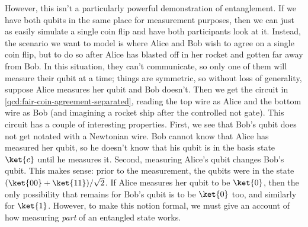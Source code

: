 However, this isn't a particularly powerful demonstration of entanglement.  If
we have both qubits in the same place for measurement purposes, then we can just
as easily simulate a single coin flip and have both participants look at it.
Instead, the scenario we want to model is where Alice and Bob wish to agree on a
single coin flip, but to do so after Alice has blasted off in her rocket and
gotten far away from Bob.  In this situation, they can't communicate, so only
one of them will measure their qubit at a time; things are symmetric, so without
loss of generality, suppose Alice measures her qubit and Bob doesn't.  Then we
get the circuit in \cref{qcd:fair-coin-agreement-separated}, reading the top
wire as Alice and the bottom wire as Bob (and imagining a rocket ship after the
controlled not gate).  This circuit has a couple of interesting properties.
First, we see that Bob's qubit does not get notated with a Newtonian wire.  Bob
cannot know that Alice has measured her qubit, so he doesn't know that his qubit
is in the basis state $\ket{c}$ until he measures it.  Second, measuring Alice's
qubit changes Bob's qubit.  This makes sense: prior to the measurement, the
qubits were in the state $(\ket{00} + \ket{11})/\sqrt{2}$.  If Alice measures
her qubit to be $\ket{0}$, then the only possibility that remains for Bob's
qubit is to be $\ket{0}$ too, and similarly for $\ket{1}$.  However, to make
this notion formal, we must give an account of how measuring \emph{part} of an
entangled state works.

